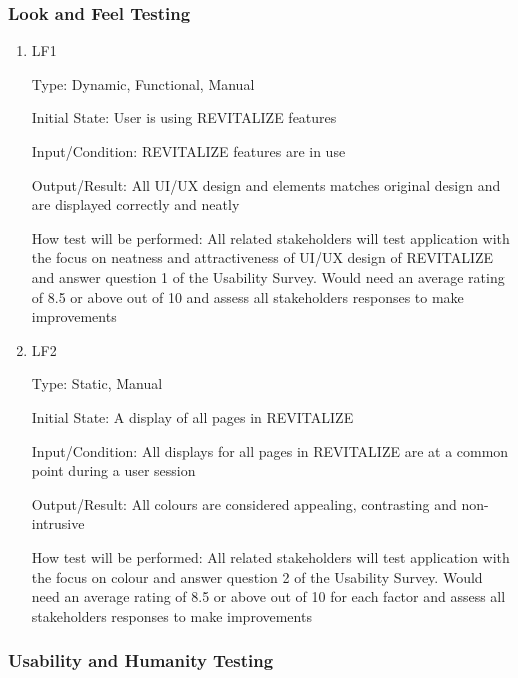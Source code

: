 \documentclass[12pt, titlepage]{article}
\begin{document}

\subsubsection{Look and Feel Testing}

\begin{enumerate}

\item{LF1\\}

Type: Dynamic, Functional, Manual
					
Initial State: User is using REVITALIZE features
					
Input/Condition: REVITALIZE features are in use
					
Output/Result: All UI/UX design and elements matches original design and are displayed correctly and neatly
					
How test will be performed: All related stakeholders will test application with the focus on neatness and attractiveness of UI/UX design of REVITALIZE and answer question 1 of the Usability Survey. Would need an average rating of 8.5 or above out of 10 and assess all stakeholders responses to make improvements
					
\item{LF2\\}

Type: Static, Manual
					
Initial State: A display of all pages in REVITALIZE
					
Input/Condition: All displays for all pages in REVITALIZE are at a common point during a user session
					
Output/Result: All colours are considered appealing, contrasting and non-intrusive
					
How test will be performed: All related stakeholders will test application with the focus on colour and answer question 2 of the Usability Survey. Would need an average rating of 8.5 or above out of 10 for each factor and assess all stakeholders responses to make improvements

\end{enumerate}

\subsubsection{Usability and Humanity Testing}
\end{document}
